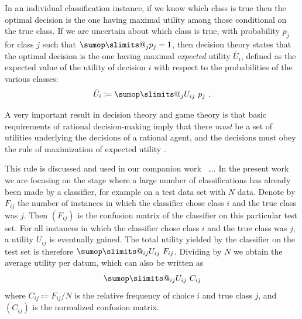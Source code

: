 \documentclass[\ifafour a4paper,12pt,\else a5paper,10pt,\fi%
onecolumn,oneside,article,%
british%
]{memoir}
\makeatletter
\theoremstyle{remark}
\theoremstyle{innote}
\def\sum{\DOTSI\sumop\slimits@}
\newcommand*{\defd}{\coloneqq}
\newcommand*{\p}{\mathrm{p}}%
\renewcommand*{\|}[1][]{\nonscript\:#1\vert\nonscript\:\mathopen{}}
\newcommand*{\sect}{\S}%
\newcommand*{\chaps}{chs}%
\newcommand*{\pencil}{{\fontencoding{U}\fontfamily{fontawesometwo}\selectfont\symbol{210}}}
\newcommand{\mynotep}[1]{{\footnotesize\color{notecolour}\pencil\ #1}}
\newcommand*{\eu}{\bar{U}}
\newcommand*{\nd}{n_{\textrm{d}}}
\makeatother
\begin{document}
In an individual classification instance, if we know which class is true then the optimal decision is the one having maximal utility among those conditional on the true class. If we are uncertain about which class is true, with probability $p_{j}$ for class $j$ such that $\sum_{j}p_{j}=1$, then decision theory states that the optimal decision is the one having maximal \emph{expected} utility $\eu_{i}$, defined as the expected value of the utility of decision $i$ with respect to the probabilities of the various classes:
\begin{equation}
  \label{eq:exp_utility}
  \eu_{i} \defd \sum_{j} U_{ij}\ p_{j} \ .
\end{equation}


A very important result in decision theory and game theory is that basic requirements of rational decision-making imply that there \emph{must} be a set of utilities underlying the decisions of a rational agent, and the decisions must obey the rule of maximization of expected utility \autocites[\sect~15.2]{russelletal1995_r2022}[\chaps~2--3]{neumannetal1944_r1955}.

This rule is discussed and used in our companion work \mynotep{\ldots}. In the present work we are focusing on the stage where a large number of classifications has already been made by a classifier, for example on a test data set with $N$ data. Denote by $F_{ij}$ the number of instances in which the classifier chose class $i$ and the true class was $j$. Then $(F_{ij})$ is the confusion matrix of the classifier on this particular test set. For all instances in which the classifier chose class $i$ and the true class was $j$, a utility $U_{ij}$ is eventually gained. The total utility yielded by the classifier on the test set is therefore $\sum_{ij} U_{ij}\ F_{ij}$. Dividing by $N$ we obtain the average utility per datum, which can also be written as
\begin{equation}
  \label{eq:final_utility}
  \sum_{ij} U_{ij}\ C_{ij}
\end{equation}
where $C_{ij} \defd F_{ij}/N$ is the relative frequency of choice $i$ and true class $j$, and $(C_{ij})$ is the normalized confusion matrix.
\end{document}
